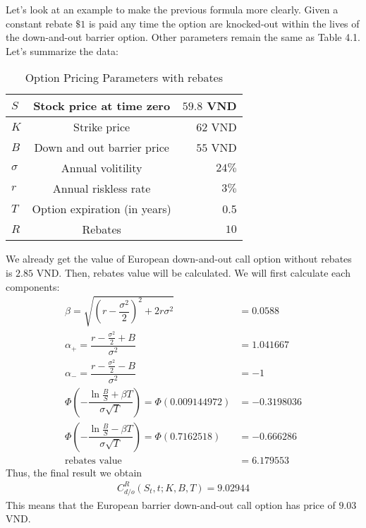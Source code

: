 Let's look at an example to make the previous formula more clearly. Given a constant rebate $\$1$ is paid any time the option are knocked-out within the lives of the down-and-out barrier option. Other parameters remain the same as Table 4.1. Let's summarize the data:\\
\begin{table}[!htp]
	\centering
	\begin{tabular}{|l|c|r|}
		\hline
		$S$ & Stock price at time zero   & $59.8$ VND\\
		\hline
		$K$ & Strike price  & $62$ VND\\
		\hline
		$B$ & Down and out barrier price & $55$ VND\\
		\hline
		$\sigma$ &  Annual volitility & $24\%$\\
		\hline
		$r$ & Annual riskless rate  & $3\%$ \\
		\hline
		$T$ & Option expiration (in years)  & 0.5\\
		\hline	
		$R$ & Rebates & $10$\\
		\hline
	\end{tabular}
	\caption{Option Pricing Parameters with rebates}
	\label{B4.3}
\end{table}
We already get the value of European down-and-out call option without rebates is $2.85$ VND. Then, rebates value will be calculated. We will first calculate each components:
\begin{align*}
	\beta=\sqrt{\left(r-\dfrac{\sigma^2}{2}\right)^2+2r\sigma^2}&=0.0588\\
	\alpha_+ = \dfrac{r-\frac{\sigma^2}{2}+ B}{\sigma^2}&= 1.041667\\
	\alpha_- = \dfrac{r-\frac{\sigma^2}{2}- B}{\sigma^2}&=-1\\
	\Phi\left(-\dfrac{\ln \frac{B}{S}+\beta T}{\sigma\sqrt{T}}\right)=\Phi(0.009144972)&= -0.3198036
	\\
	\Phi\left(-\dfrac{\ln \frac{B}{S}-\beta T}{\sigma\sqrt{T}}\right)=\Phi( 0.7162518)&=-0.666286\\
	\text{rebates value}&=6.179553
\end{align*}
Thus, the final result we obtain
\begin{align*}
	C^R_{d/o}(S_t,t;K,B,T)=9.02944
\end{align*}
This means that the European barrier down-and-out call option has price of $9.03$ VND.

